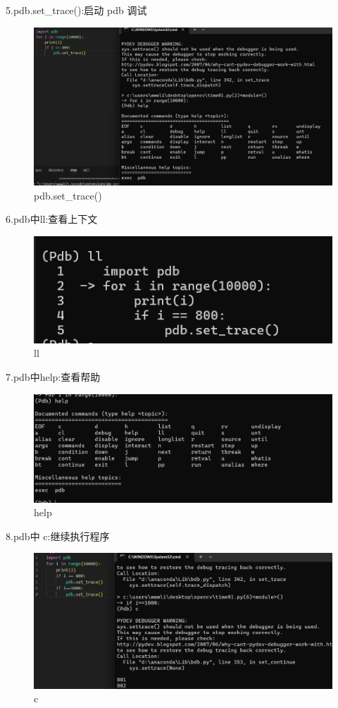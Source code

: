 \documentclass[a4paper, 12pt]{article}
\begin{document}
5.pdb.set\_trace():启动 pdb 调试
\begin{figure}[H]
  \centering
  \includegraphics[width=\textwidth]{屏幕截图 2024-09-15 153834.png}
  \caption{pdb.set\_trace()}
\end{figure}

6.pdb中ll:查看上下文
\begin{figure}[H]
  \centering
  \includegraphics[width=\textwidth]{屏幕截图 2024-09-15 155054.png}
  \caption{ll}
\end{figure}

7.pdb中help:查看帮助   
\begin{figure}[H]
  \centering
  \includegraphics[width=\textwidth]{屏幕截图 2024-09-15 162427.png}
  \caption{help}
\end{figure}
8.pdb中 c:继续执行程序  
\begin{figure}[H]
  \centering
  \includegraphics[width=\textwidth]{屏幕截图 2024-09-15 162600.png}
  \caption{c}
\end{figure}
\end{document}
